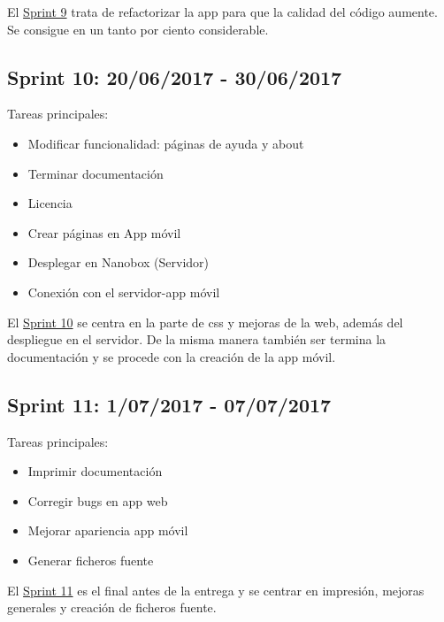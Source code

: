 
El \underline{Sprint 9} trata de refactorizar la app para que la calidad del código aumente. Se consigue en un tanto por ciento considerable. 

\subsection{Sprint 10: 20/06/2017 - 30/06/2017}\label{sprint10}

Tareas principales:

\begin{itemize}
	\item Modificar funcionalidad: páginas de ayuda y about
	\item Terminar documentación
	\item Licencia
	\item Crear páginas en App móvil
	\item Desplegar en Nanobox (Servidor)
	\item Conexión con el servidor-app móvil
\end{itemize}


El \underline{Sprint 10} se centra en la parte de css y mejoras de la web, además del despliegue en el servidor. De la misma manera también ser termina la documentación y se procede con la creación de la app móvil.

\subsection{Sprint 11: 1/07/2017 - 07/07/2017}\label{sprint11}

Tareas principales:

\begin{itemize}
	\item Imprimir documentación
	\item Corregir bugs en app web
	\item Mejorar apariencia app móvil
	\item Generar ficheros fuente
	
\end{itemize}


El \underline{Sprint 11} es el final antes de la entrega y se centrar en impresión, mejoras generales y creación de ficheros fuente.


